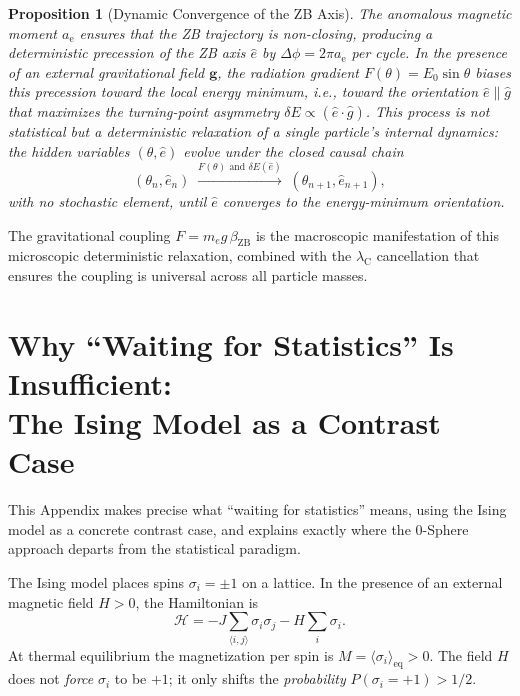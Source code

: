 \documentclass[%
 reprint, amsmath,amssymb, aps, prb, ]{revtex4-2}
\numberwithin{equation}{section}
\newtheorem{proposition}[theorem]{Proposition}
\newcommand{\iphase}{\theta}
\newcommand{\lambdaC}{\lambda_{\mathrm{C}}}
\newcommand{\betaZB}{\beta_{\mathrm{ZB}}}
\newcommand{\anom}{a_{\mathrm{e}}}
\begin{document}
\begin{proposition}[Dynamic Convergence of the ZB Axis]
\label{prop:dynamic_convergence}
The anomalous magnetic moment $\anom$ ensures that the ZB trajectory is non-closing, producing a deterministic precession of the ZB axis $\hat{e}$ by $\Delta\phi = 2\pi\anom$ per cycle. In the presence of an external gravitational field $\mathbf{g}$, the radiation gradient $F(\iphase) = E_0\sin\iphase$ biases this precession toward the local energy minimum, i.e., toward the orientation $\hat{e} \parallel \hat{g}$ that maximizes the turning-point asymmetry $\delta E \propto (\hat{e}\cdot\hat{g})$. This process is not statistical but a \emph{deterministic relaxation} of a single particle's internal dynamics: the hidden variables $(\iphase, \hat{e})$ evolve under the closed causal chain
\begin{equation}
(\iphase_n, \hat{e}_n) \;\xrightarrow{F(\iphase)\text{ and }\delta E(\hat{e})}\; (\iphase_{n+1}, \hat{e}_{n+1}),
\label{eq:causal_chain_prop}
\end{equation}
with no stochastic element, until $\hat{e}$ converges to the energy-minimum orientation.
\end{proposition}

The gravitational coupling $F = m_e g\,\betaZB$ is the macroscopic manifestation of this microscopic deterministic relaxation, combined with the $\lambdaC$ cancellation that ensures the coupling is universal across all particle masses.

\section{Why ``Waiting for Statistics'' Is Insufficient:\\
         The Ising Model as a Contrast Case}
\label{app:ising}

This Appendix makes precise what ``waiting for statistics'' means, using the Ising model as a concrete contrast case, and explains exactly where the 0-Sphere approach departs from the statistical paradigm.

The Ising model places spins $\sigma_i = \pm 1$ on a lattice. In the presence of an external magnetic field $H > 0$, the Hamiltonian is
\begin{equation}
\mathcal{H} = -J\sum_{\langle i,j\rangle}\sigma_i\sigma_j - H\sum_i\sigma_i.
\label{eq:ising}
\end{equation}
At thermal equilibrium the magnetization per spin is $M = \langle\sigma_i\rangle_{\mathrm{eq}} > 0$. The field $H$ does not \emph{force} $\sigma_i$ to be $+1$; it only shifts the \emph{probability} $P(\sigma_i=+1) > 1/2$.
\end{document}
